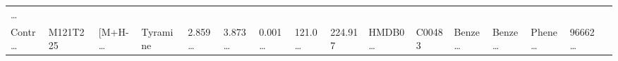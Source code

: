 \documentclass[
]{article}
\begin{document}
\begin{longtable}[]{@{}llllllllllllllll@{}}
\begin{minipage}[t]{0.02\columnwidth}
\ldots{}\strut
\end{minipage}\tabularnewline
\begin{minipage}[t]{0.04\columnwidth}\raggedright
Contr\ldots{}\strut
\end{minipage} & \begin{minipage}[t]{0.04\columnwidth}\raggedright
M121T225\strut
\end{minipage} & \begin{minipage}[t]{0.04\columnwidth}\raggedright
{[}M+H-\ldots{}\strut
\end{minipage} & \begin{minipage}[t]{0.04\columnwidth}\raggedright
Tyramine\strut
\end{minipage} & \begin{minipage}[t]{0.04\columnwidth}\raggedright
2.859\ldots{}\strut
\end{minipage} & \begin{minipage}[t]{0.04\columnwidth}\raggedright
3.873\ldots{}\strut
\end{minipage} & \begin{minipage}[t]{0.04\columnwidth}\raggedright
0.001\ldots{}\strut
\end{minipage} & \begin{minipage}[t]{0.04\columnwidth}\raggedright
121.0\ldots{}\strut
\end{minipage} & \begin{minipage}[t]{0.04\columnwidth}\raggedright
224.917\strut
\end{minipage} & \begin{minipage}[t]{0.04\columnwidth}\raggedright
HMDB0\ldots{}\strut
\end{minipage} & \begin{minipage}[t]{0.03\columnwidth}\raggedright
C00483\strut
\end{minipage} & \begin{minipage}[t]{0.04\columnwidth}\raggedright
Benze\ldots{}\strut
\end{minipage} & \begin{minipage}[t]{0.04\columnwidth}\raggedright
Benze\ldots{}\strut
\end{minipage} & \begin{minipage}[t]{0.04\columnwidth}\raggedright
Phene\ldots{}\strut
\end{minipage} & \begin{minipage}[t]{0.04\columnwidth}\raggedright
96662\ldots{}\strut
\end{minipage} & \begin{minipage}[t]{0.02\columnwidth}\raggedright

\end{minipage}
\end{longtable}
\end{document}
